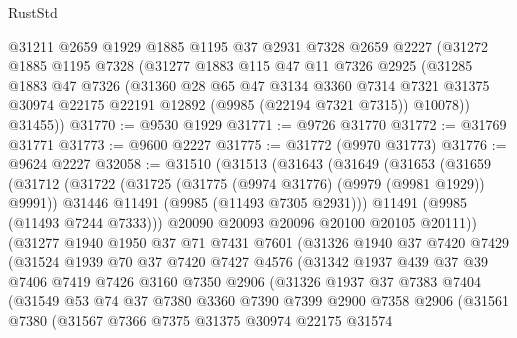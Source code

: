 \begin{lexlean}{RustStd}
\begin{coremodule}
    @31211
    @2659
    @1929
    @1885
    @1195
    @37
    @2931
    @7328
    @2659
    @2227
    (@31272
      @1885
      @1195
      @7328
      (@31277
        @1883
        @115
        @47
        @11
        @7326
        @2925
        (@31285
          @1883
          @47
          @7326
          (@31360
            @28
            @65
            @47
            @3134
            @3360
            @7314
            @7321
            @31375
            @30974
            @22175
            @22191
            @12892
            (@9985 (@22194 @7321 @7315))
            @10078))
        @31455))
@31770 := @9530 @1929
@31771 := @9726 @31770
@31772 := @31769 @31771
@31773 := @9600 @2227
@31775 := @31772 (@9970 @31773)
@31776 := @9624 @2227
@32058 := @31510
    (@31513
      (@31643
        (@31649
          (@31653
            (@31659
              (@31712
                (@31722
                  (@31725 (@31775 (@9974 @31776) (@9979 (@9981 @1929)) @9991))
                  @31446
                  @11491
                  (@9985 (@11493 @7305 @2931)))
                @11491
                (@9985 (@11493 @7244 @7333)))
              @20090
              @20093
              @20096
              @20100
              @20105
              @20111))
          (@31277
            @1940
            @1950
            @37
            @71
            @7431
            @7601
            (@31326
              @1940
              @37
              @7420
              @7429
              (@31524
                @1939
                @70
                @37
                @7420
                @7427
                @4576
                (@31342
                  @1937
                  @439
                  @37
                  @39
                  @7406
                  @7419
                  @7426
                  @3160
                  @7350
                  @2906
                  (@31326
                    @1937
                    @37
                    @7383
                    @7404
                    (@31549
                      @53
                      @74
                      @37
                      @7380
                      @3360
                      @7390
                      @7399
                      @2900
                      @7358
                      @2906
                      (@31561
                        @7380
                        (@31567
                          @7366
                          @7375
                          @31375
                          @30974
                          @22175
                          @31574

\end{coremodule}
\end{lexlean}
